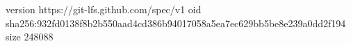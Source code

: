 version https://git-lfs.github.com/spec/v1
oid sha256:932fd0138f8b2b550aad4cd386b94017058a5ea7ec629bb5be8e239a0dd2f194
size 248088
